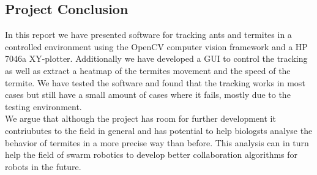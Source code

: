 
\subsection{Project Conclusion}

In this report we have presented software for tracking ants and termites in a controlled environment using the OpenCV computer vision framework and a HP 7046a XY-plotter. Additionally we have developed a GUI to control the tracking as well as extract a heatmap of the termites movement and the speed of the termite. We have tested the software and found that the tracking works in most cases but still have a small amount of cases where it fails, mostly due to the testing environment. \\

We argue that although the project has room for further development it contriubutes to the field in general and has potential to help biologsts analyse the behavior of termites in a more precise way than before. This analysis can in turn help the field of swarm robotics to develop better collaboration algorithms for robots in the future.

